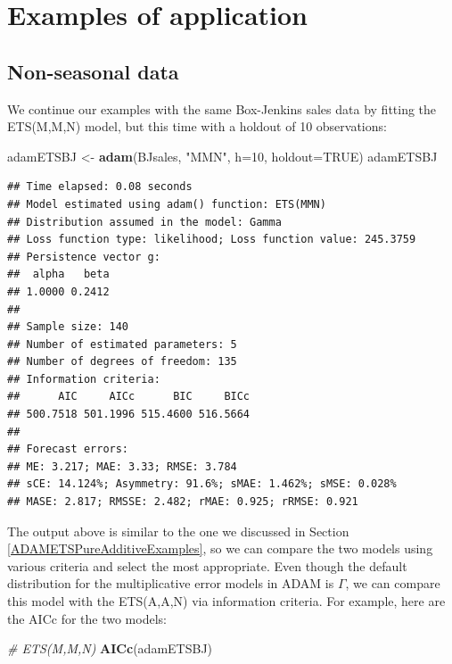 \documentclass[]{book}
\newenvironment{Shaded}{\begin{snugshade}}{\end{snugshade}}
\newcommand{\CommentTok}[1]{\textcolor[rgb]{0.56,0.35,0.01}{\textit{#1}}}
\newcommand{\DataTypeTok}[1]{\textcolor[rgb]{0.13,0.29,0.53}{#1}}
\newcommand{\DecValTok}[1]{\textcolor[rgb]{0.00,0.00,0.81}{#1}}
\newcommand{\KeywordTok}[1]{\textcolor[rgb]{0.13,0.29,0.53}{\textbf{#1}}}
\newcommand{\NormalTok}[1]{#1}
\newcommand{\OtherTok}[1]{\textcolor[rgb]{0.56,0.35,0.01}{#1}}
\newcommand{\StringTok}[1]{\textcolor[rgb]{0.31,0.60,0.02}{#1}}
\theoremstyle{definition}
\theoremstyle{definition}
\theoremstyle{definition}
\theoremstyle{definition}
\theoremstyle{remark}
\begin{document}
\hypertarget{ADAMETSMultiplicativeExamples}{%
\section{Examples of application}\label{ADAMETSMultiplicativeExamples}}

\hypertarget{non-seasonal-data-1}{%
\subsection{Non-seasonal data}\label{non-seasonal-data-1}}

We continue our examples with the same Box-Jenkins sales data by fitting the ETS(M,M,N) model, but this time with a holdout of 10 observations:

\begin{Shaded}
\begin{Highlighting}[]
\NormalTok{adamETSBJ <-}\StringTok{ }\KeywordTok{adam}\NormalTok{(BJsales, }\StringTok{"MMN"}\NormalTok{, }\DataTypeTok{h=}\DecValTok{10}\NormalTok{, }\DataTypeTok{holdout=}\OtherTok{TRUE}\NormalTok{)}
\NormalTok{adamETSBJ}
\end{Highlighting}
\end{Shaded}

\begin{verbatim}
## Time elapsed: 0.08 seconds
## Model estimated using adam() function: ETS(MMN)
## Distribution assumed in the model: Gamma
## Loss function type: likelihood; Loss function value: 245.3759
## Persistence vector g:
##  alpha   beta 
## 1.0000 0.2412 
## 
## Sample size: 140
## Number of estimated parameters: 5
## Number of degrees of freedom: 135
## Information criteria:
##      AIC     AICc      BIC     BICc 
## 500.7518 501.1996 515.4600 516.5664 
## 
## Forecast errors:
## ME: 3.217; MAE: 3.33; RMSE: 3.784
## sCE: 14.124%; Asymmetry: 91.6%; sMAE: 1.462%; sMSE: 0.028%
## MASE: 2.817; RMSSE: 2.482; rMAE: 0.925; rRMSE: 0.921
\end{verbatim}

The output above is similar to the one we discussed in Section \ref{ADAMETSPureAdditiveExamples}, so we can compare the two models using various criteria and select the most appropriate. Even though the default distribution for the multiplicative error models in ADAM is \(\Gamma\), we can compare this model with the ETS(A,A,N) via information criteria. For example, here are the AICc for the two models:

\begin{Shaded}
\begin{Highlighting}[]
\CommentTok{# ETS(M,M,N)}
\KeywordTok{AICc}\NormalTok{(adamETSBJ)}
\end{Highlighting}
\end{Shaded}
\end{document}
